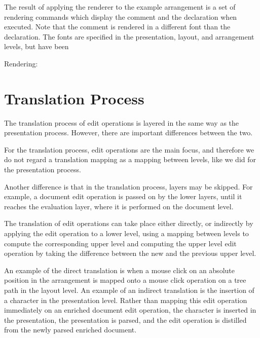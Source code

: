 The result of applying the renderer to the example arrangement is a set of rendering commands which display the comment and the declaration when executed. Note that the comment is rendered in a different font than the declaration. The fonts are specified in the presentation, layout, and arrangement levels, but have been 

Rendering:



\section{Translation Process}

The translation process of edit operations is layered in the same way as the presentation process. However, there are important differences between the two.

For the translation process, edit operations are the main focus, and therefore we do not regard a translation mapping as a mapping between levels, like we did for the presentation process.

Another difference is that in the translation process, layers may be skipped. For example, a document edit operation is passed on by the lower layers, until it reaches the evaluation layer, where it is performed on the document level.

The translation of edit operations can take place either directly, or indirectly by applying the edit operation to a lower level, using a mapping between levels to compute the corresponding upper level and computing the upper level edit operation by taking the difference between the new and the previous upper level.

An example of the direct translation is when a mouse click on an absolute position in the arrangement is mapped onto a mouse click operation on a tree path in the layout level. An example of an indirect translation is the insertion of a character in the presentation level. Rather than mapping this edit operation immediately on an enriched document edit operation, the character is inserted in the presentation, the presentation is parsed, and the edit operation is distilled from the newly parsed enriched document.

